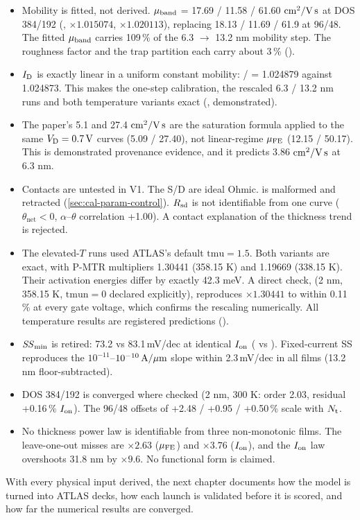 \begin{keyresult}
\begin{itemize}[leftmargin=1.2em]
\item Mobility is fitted, not derived. $\mu_{\mathrm{band}}$ = 17.69 / 11.58 / 61.60\,$\,\mathrm{cm}^{2}/\mathrm{V\,s}$ at DOS 384/192 (,  $\times1.015074$,  $\times1.020113$), replacing 18.13 / 11.69 / 61.9 at 96/48. The fitted $\mu_{\mathrm{band}}$ carries 109\,\% of the 6.3 $\rightarrow$ 13.2 nm mobility step. The roughness factor and the trap partition each carry about 3\,\% (\evCAL).
\item $I_{\mathrm{D}}$ is exactly linear in a uniform constant mobility: / = 1.024879 against 1.024873. This makes the one-step calibration, the rescaled 6.3 / 13.2 nm runs and both temperature variants exact (\evNUM, demonstrated).
\item The paper's 5.1 and 27.4\,$\,\mathrm{cm}^{2}/\mathrm{V\,s}$ are the saturation formula applied to the same $V_{\mathrm{D}}=\SI{0.7}{V}$ curves (5.09 / 27.40), not linear-regime $\mu_{\mathrm{FE}}$ (12.15 / 50.17). This is demonstrated provenance evidence, and it predicts 3.86\,$\,\mathrm{cm}^{2}/\mathrm{V\,s}$ at 6.3 nm.
\item Contacts are untested in V1. The S/D are ideal Ohmic.  is malformed and retracted (\cref{sec:cal-param-control}). $R_{\mathrm{sd}}$ is not identifiable from one curve ($\theta_{\mathrm{net}}<0$, $\alpha$--$\theta$ correlation +1.00). A contact explanation of the thickness trend is rejected.
\item The elevated-$T$ runs used ATLAS's default $\mathrm{tmu}=1.5$. Both variants are exact, with P-MTR multipliers 1.30441 (358.15 K) and 1.19669 (338.15 K). Their activation energies differ by exactly 42.3 meV. A direct check,  (2 nm, 358.15 K, $\mathrm{tmun}=0$ declared explicitly), reproduces $\times1.30441$ to within 0.11\,\% at every gate voltage, which confirms the rescaling numerically. All temperature results are registered predictions (\evPRED).
\item $\mathit{SS}_{\min}$ is retired: 73.2 vs 83.1\,mV/dec at identical $I_{\mathrm{on}}$ ( vs ). Fixed-current SS reproduces the $10^{-11}$--$10^{-10}\,\mathrm{A}/\mu\mathrm{m}$ slope within 2.3\,mV/dec in all films (13.2 nm floor-subtracted).
\item DOS 384/192 is converged where checked (2 nm, 300 K: order 2.03, residual +0.16\,\% $I_{\mathrm{on}}$). The 96/48 offsets of +2.48 / +0.95 / +0.50\,\% scale with $N_{\mathrm{t}}$.
\item No thickness power law is identifiable from three non-monotonic films. The leave-one-out misses are $\times2.63$ ($\mu_{\mathrm{FE}}$) and $\times3.76$ ($I_{\mathrm{on}}$), and the $I_{\mathrm{on}}$ law overshoots 31.8 nm by $\times9.6$. No functional form is claimed.
\end{itemize}
\end{keyresult}

With every physical input derived, the next chapter documents how the model is turned into ATLAS decks, how each launch is validated before it is scored, and how far the numerical results are converged.

